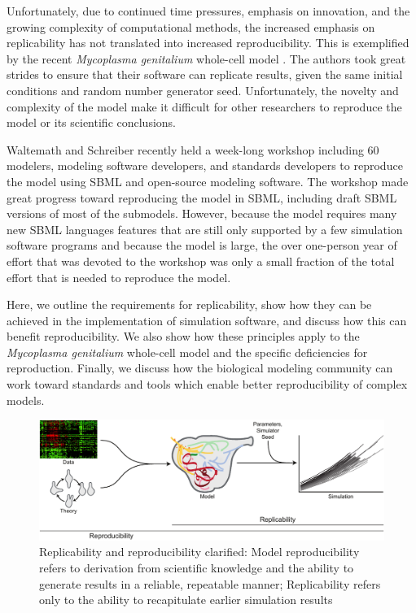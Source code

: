 \documentclass[journal,transmag,twoside]{IEEEtran}
\begin{document}
Unfortunately, due to continued time pressures, emphasis on innovation, and the growing complexity of computational methods, the increased emphasis on replicability has not translated into increased reproducibility. This is exemplified by the recent \textit{Mycoplasma genitalium} whole-cell model \cite{Karr2012}. The authors took great strides to ensure that their software can replicate results, given the same initial conditions and random number generator seed. Unfortunately, the novelty and complexity of the model make it difficult for other researchers to reproduce the model or its scientific conclusions. 

Waltemath and Schreiber recently held a week-long workshop including 60 modelers, modeling software developers, and standards developers to reproduce the model using SBML and open-source modeling software. The workshop made great progress toward reproducing the model in SBML, including draft SBML versions of most of the submodels. However, because the model requires many new SBML languages features that are still only supported by a few simulation software programs and because the model is large, the over one-person year of effort that was devoted to the workshop was only a small fraction of the total effort that is needed to reproduce the model.

Here, we outline the requirements for replicability, show how they can
be achieved in the implementation of simulation software, and discuss how this can benefit
reproducibility. We also show how these principles apply to the \textit{Mycoplasma genitalium} whole-cell
model \cite{Karr2012} and the specific deficiencies for reproduction.
Finally, we discuss how the biological modeling community can work toward standards
and tools which enable better reproducibility of complex models.

\begin{figure}[!t]
\centering
\includegraphics[width=\textwidth]{figure1/figure1}
\caption{Replicability and reproducibility clarified: Model reproducibility refers to derivation from scientific knowledge and the ability to generate results in a reliable, repeatable manner;
Replicability refers only to the ability to recapitulate earlier simulation results}
\label{fig_repro_diagram}
\end{figure}
\end{document}
